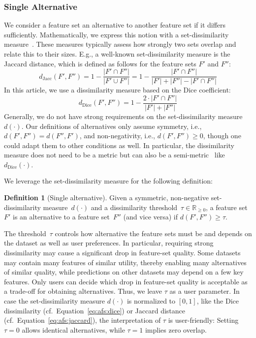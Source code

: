\documentclass{article}
\theoremstyle{definition}
\newtheorem{definition}{Definition}
\begin{document}
\subsubsection{Single Alternative}
\label{sec:afs:approach:constraints:single}

We consider a feature set an alternative to another feature set if it differs sufficiently.
Mathematically, we express this notion with a set-dissimilarity measure~\cite{choi2010survey, egghe2009new}.
These measures typically assess how strongly two sets overlap and relate this to their sizes.
E.g., a well-known set-dissimilarity measure is the Jaccard distance, which is defined as follows for the feature sets $F'$ and $F''$:
%
\begin{equation}
	d_{\text{Jacc}}(F',F'') = 1 - \frac{|F' \cap F''|}{|F' \cup F''|} = 1 - \frac{|F' \cap F''|}{|F'| + |F''| - |F' \cap F''|}
	\label{eq:afs:jaccard}
\end{equation}
%
In this article, we use a dissimilarity measure based on the Dice coefficient:
%
\begin{equation}
	d_{\text{Dice}}(F',F'') = 1 - \frac{2 \cdot |F' \cap F''|}{|F'| + |F''|}
	\label{eq:afs:dice}
\end{equation}
%
Generally, we do not have strong requirements on the set-dissimilarity measure~$d(\cdot)$.
Our definitions of alternatives only assume symmetry, i.e., $d(F',F'')=d(F'',F')$, and non-negativity, i.e., $d(F',F'') \geq 0$, though one could adapt them to other conditions as well.
In particular, the dissimilarity measure does not need to be a metric but can also be a semi-metric~\cite{wilson1931semi} like~$d_{\text{Dice}}(\cdot)$.

We leverage the set-dissimilarity measure for the following definition:
%
\begin{definition}[Single alternative]
	Given a symmetric, non-negative set-dissimi\-larity measure~$d(\cdot)$ and a dissimilarity threshold~$\tau \in \mathbb{R}_{\geq 0}$, a feature set $F'$ is an alternative to a feature set~$F''$ (and vice versa) if $d(F',F'') \geq \tau$.
	\label{def:afs:single-alternative}
\end{definition}
%
The threshold~$\tau$ controls how alternative the feature sets must be and depends on the dataset as well as user preferences.
In particular, requiring strong dissimilarity may cause a significant drop in feature-set quality.
Some datasets may contain many features of similar utility, thereby enabling many alternatives of similar quality, while predictions on other datasets may depend on a few key features.
Only users can decide which drop in feature-set quality is acceptable as a trade-off for obtaining alternatives.
Thus, we leave $\tau$ as a user parameter.
In case the set-dissimilarity measure $d(\cdot)$ is normalized to $[0,1]$, like the Dice dissimilarity (cf.~Equation~\ref{eq:afs:dice}) or Jaccard distance (cf.~Equation~\ref{eq:afs:jaccard}), the interpretation of $\tau$ is user-friendly:
Setting $\tau=0$ allows identical alternatives, while $\tau=1$ implies zero overlap.
\end{document}
